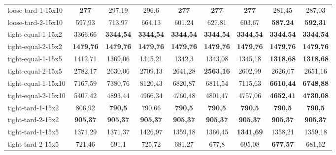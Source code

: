 \begin{table}
{\begin{tabular}{lcccccccc}
loose-tard-1-15x10  & \textbf{277}     & 297,19          & 296,6           & \textbf{277}     & \textbf{277}     & \textbf{277}       & 281,45              & 287,03              \\
loose-tard-2-15x10  & 597,93  & 713,97          & 664,13          & 601,24          & 627,81          & 603,67                        & \textbf{587,24}     & \textbf{592,31}         \\
tight-equal-1-15x2  & 3366,66         & \textbf{3344,54} & \textbf{3344,54} & \textbf{3344,54} & \textbf{3344,54} & \textbf{3344,54}  & \textbf{3344,54}    & \textbf{3344,54}   \\
tight-equal-2-15x2  & \textbf{1479,76} & \textbf{1479,76} & \textbf{1479,76} & \textbf{1479,76} & \textbf{1479,76} & \textbf{1479,76} & \textbf{1479,76}    & \textbf{1479,76}   \\
tight-equal-1-15x5  & 1412,71         & 1369,06         & 1345,21         & 1342,3          & 1343,08         & 1345,18               & \textbf{1318,68}    & \textbf{1318,68}   \\
tight-equal-2-15x5  & 2782,17         & 2630,06         & 2709,13         & 2641,28         & \textbf{2563,16} & 2602,99               & 2626,67             & 2651,16           \\
tight-equal-1-15x10 & 7167,59         & 7380,76         & 8120,43         & 6820,87         & 6811,54 & 7115,63                       & \textbf{6610,44}    & \textbf{6748,88}           \\
tight-equal-2-15x10 & 5407,42         & 4893,44         & 4966,34         & 4760,48         & 4801,47         & 4757,06                & \textbf{4652,41}    & \textbf{4730,08}    \\
tight-tard-1-15x2   & 806,92          & \textbf{790,5}   & 790,66          & \textbf{790,5}   & \textbf{790,5}   & \textbf{790,5}     & \textbf{790,5}      & \textbf{790,5}       \\
tight-tard-2-15x2   & \textbf{905,37}  & \textbf{905,37}  & \textbf{905,37}  & \textbf{905,37}  & \textbf{905,37}  & \textbf{905,37}   & \textbf{905,37}     & \textbf{905,37}      \\
tight-tard-1-15x5   & 1371,29         & 1371,37         & 1426,97         & 1359,18         & 1366,45         & \textbf{1341,69}       & 1358,21             & 1359,18            \\
tight-tard-2-15x5   & 721,46          & 691,1           & 725,72          & 681,27          & 677,8           & 695,08                 & \textbf{677,57}     & 681,62     \\

\end{tabular}}
\end{table}
